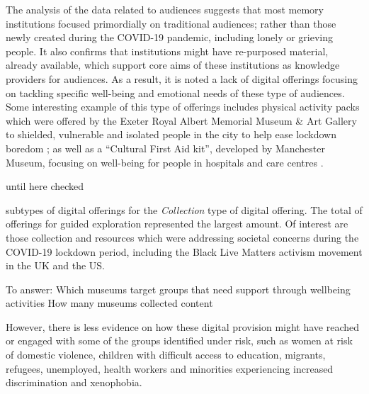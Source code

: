 \documentclass{egpubl}
\begin{document}
The analysis of the data related to audiences suggests that most memory institutions focused primordially on traditional audiences;  rather than those newly created during the COVID-19 pandemic, including lonely or grieving people. It also confirms that institutions might have re-purposed material, already available, which support core aims of these institutions as knowledge providers for audiences. As a result, it is noted a lack of digital offerings focusing on tackling specific well-being and emotional needs of these type of audiences. Some interesting example  of this  type of offerings includes physical activity packs which were offered by the Exeter Royal Albert Memorial Museum \& Art Gallery to shielded, vulnerable and isolated people in the city to help ease lockdown boredom \cite{ex2020}; as well as a ``Cultural First Aid kit'', developed by Manchester Museum, focusing on well-being for people in hospitals and care centres \cite{man2020}. 

\color{red}until here checked \color{black}








 subtypes of digital offerings for the \emph{Collection} type of digital offering. The total of offerings for guided exploration represented the largest amount. Of interest are those collection and resources which were addressing  societal concerns during the COVID-19 lockdown period, including the Black Live Matters activism movement in the UK and the US. 





\color{red}To answer:
Which museums target groups that need support through wellbeing activities
How many museums collected content 
\color{black}

However, there is less evidence on how these digital provision might have reached or engaged with some of the groups identified under risk, such as women at risk of domestic violence, children with difficult access to education, migrants, refugees, unemployed, health workers and minorities experiencing increased discrimination and xenophobia. 
\end{document}
